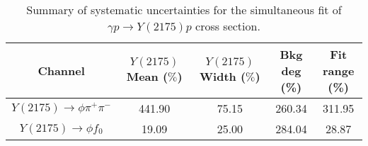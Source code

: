 \begin{table}[htbp]
    \small
    \centering
    \caption{Summary of systematic uncertainties for the simultaneous fit of $\gamma p \rightarrow Y(2175) p$ cross section.}
    \label{tab.syserr.simpdf}
    \begin{tabular}{|c|c|c|c|c|}
        \hline
        Channel & \thead{$Y(2175)$ Mean\\($\%$)} & \thead{$Y(2175)$ Width\\($\%$)} & \thead{Bkg deg\\(\%)} & \thead{Fit range\\(\%)} \\
        \hline
        $Y(2175)\rightarrow \phi \pi^{+} \pi^{-}$ & 441.90 & 75.15 & 260.34 & 311.95 \\ 
        $Y(2175)\rightarrow \phi f_0$ & 19.09 & 25.00 & 284.04 & 28.87 \\
        \hline
    \end{tabular}
\end{table}
